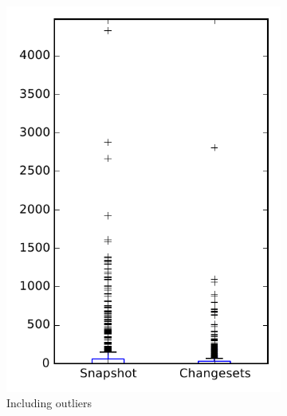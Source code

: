 
\begin{figure}
    \centering
    \begin{subfigure}{.4\textwidth}
        \centering
        \includegraphics[height=0.4\textheight]{figures/flt/rq1_overview}
        \caption{Including outliers}\label{fig:flt:rq1:overview_outlier}
    \end{subfigure}%
    \begin{subfigure}{.4\textwidth}
        \centering

\end{subfigure}
\end{figure}
